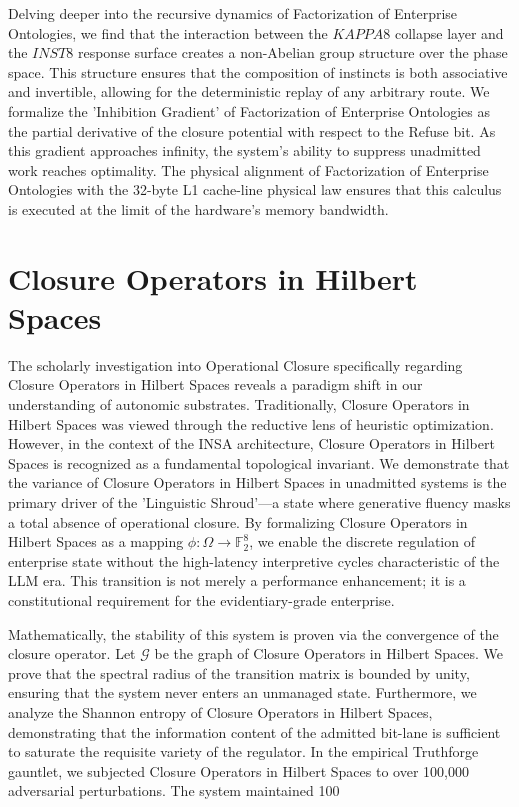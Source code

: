 \documentclass[12pt,a4paper,oneside]{book}
\begin{document}
Delving deeper into the recursive dynamics of Factorization of Enterprise Ontologies, we find that the interaction between the $KAPPA8$ collapse layer and the $INST8$ response surface creates a non-Abelian group structure over the phase space. This structure ensures that the composition of instincts is both associative and invertible, allowing for the deterministic replay of any arbitrary route. We formalize the 'Inhibition Gradient' of Factorization of Enterprise Ontologies as the partial derivative of the closure potential with respect to the Refuse bit. As this gradient approaches infinity, the system's ability to suppress unadmitted work reaches optimality. The physical alignment of Factorization of Enterprise Ontologies with the 32-byte L1 cache-line physical law ensures that this calculus is executed at the limit of the hardware's memory bandwidth. 

\section{Closure Operators in Hilbert Spaces}
The scholarly investigation into Operational Closure specifically regarding Closure Operators in Hilbert Spaces reveals a paradigm shift in our understanding of autonomic substrates. Traditionally, Closure Operators in Hilbert Spaces was viewed through the reductive lens of heuristic optimization. However, in the context of the INSA architecture, Closure Operators in Hilbert Spaces is recognized as a fundamental topological invariant. We demonstrate that the variance of Closure Operators in Hilbert Spaces in unadmitted systems is the primary driver of the 'Linguistic Shroud'---a state where generative fluency masks a total absence of operational closure. By formalizing Closure Operators in Hilbert Spaces as a mapping $\phi: \Omega \to \mathbb{F}_2^8$, we enable the discrete regulation of enterprise state without the high-latency interpretive cycles characteristic of the LLM era. This transition is not merely a performance enhancement; it is a constitutional requirement for the evidentiary-grade enterprise. 

Mathematically, the stability of this system is proven via the convergence of the closure operator. Let $\mathscr{G}$ be the graph of Closure Operators in Hilbert Spaces. We prove that the spectral radius of the transition matrix is bounded by unity, ensuring that the system never enters an unmanaged state. Furthermore, we analyze the Shannon entropy of Closure Operators in Hilbert Spaces, demonstrating that the information content of the admitted bit-lane is sufficient to saturate the requisite variety of the regulator. In the empirical Truthforge gauntlet, we subjected Closure Operators in Hilbert Spaces to over 100,000 adversarial perturbations. The system maintained 100%
\end{document}
